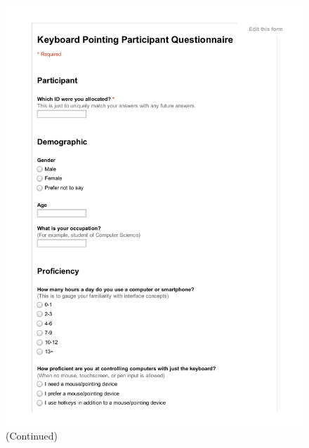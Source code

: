 \documentclass[11pt,openright,a4paper]{report}
\newcommand{\safefigheight}{\dimexpr\textheight-1.1\baselineskip-\abovecaptionskip-\belowcaptionskip\relax}
\begin{document}
\begin{figure}[ht]
\ContinuedFloat
\includegraphics[page=3,width=\textwidth,height=\safefigheight,keepaspectratio]{sheets/PreQuestionnaire.pdf}
\caption{ (Continued)}
\end{figure}
\end{document}
